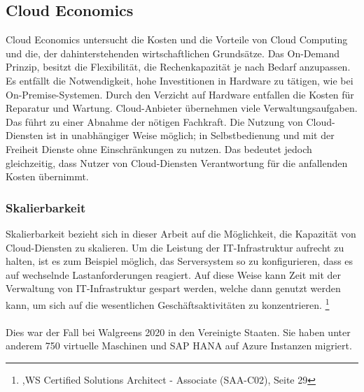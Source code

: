 \subsection{Cloud Economics}\label{subsec_UabsGrund3}
\begin{flushleft}
Cloud Economics untersucht die Kosten und die Vorteile von Cloud Computing und die, der dahinterstehenden wirtschaftlichen Grundsätze. Das On-Demand Prinzip, besitzt die Flexibilität, die Rechenkapazität je nach Bedarf anzupassen. Es entfällt die Notwendigkeit, hohe Investitionen in Hardware zu tätigen, wie bei On-Premise-Systemen.
Durch den Verzicht auf Hardware entfallen die Kosten für Reparatur und Wartung. Cloud-Anbieter übernehmen viele Verwaltungsaufgaben. Das führt zu einer Abnahme der nötigen Fachkraft\cite{IDC01}. Die Nutzung von Cloud-Diensten ist in unabhängiger Weise möglich; in Selbstbedienung und mit der Freiheit Dienste ohne Einschränkungen zu nutzen. Das bedeutet jedoch gleichzeitig, dass Nutzer von Cloud-Diensten Verantwortung für die anfallenden Kosten übernimmt.
\end{flushleft}

\subsubsection{Skalierbarkeit}
Skalierbarkeit bezieht sich in dieser Arbeit auf die Möglichkeit, die Kapazität von Cloud-Diensten zu skalieren. Um die Leistung der IT-Infrastruktur aufrecht zu halten, ist es zum Beispiel möglich, das Serversystem so zu konfigurieren, dass es auf wechselnde Lastanforderungen reagiert.
%
Auf diese Weise kann Zeit mit der Verwaltung von IT-Infrastruktur gespart werden, welche dann genutzt werden kann, um sich auf die wesentlichen Geschäftsaktivitäten zu konzentrieren.
\footnote{\cite{AWS1},WS Certified Solutions Architect - Associate (SAA-C02), Seite 29}
\\\\
Dies war der Fall bei Walgreens 2020 in den Vereinigte Staaten.
Sie haben unter anderem 750 virtuelle Maschinen und SAP HANA auf Azure Instanzen migriert.

